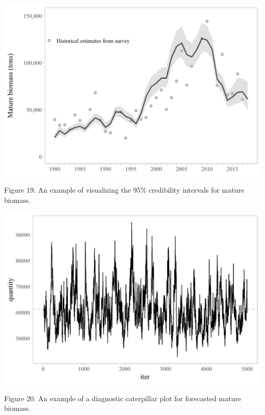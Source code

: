\documentclass[]{article}
\begin{document}
\includegraphics[width=1\linewidth]{../../HER/figs/HER/matbiomass_mcmc_plot}

Figure 19. An example of visualizing the 95\% credibility intervals for
mature biomass.

\includegraphics[width=1\linewidth]{../../HER/figs/HER/caterpillar_forematb}

Figure 20. An example of a diagnostic caterpillar plot for forecasted
mature biomass.
\end{document}
